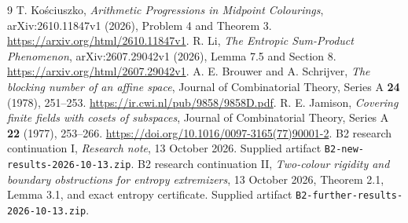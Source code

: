 \documentclass[11pt]{article}
\theoremstyle{remark}\newtheorem{remark}[theorem]{Remark}
\begin{document}
\begin{thebibliography}{9}
\small\setlength{\itemsep}{3pt}
T. Ko\'sciuszko, \emph{Arithmetic Progressions in Midpoint Colourings},
arXiv:2610.11847v1 (2026), Problem 4 and Theorem 3.
\url{https://arxiv.org/html/2610.11847v1}.
R. Li, \emph{The Entropic Sum-Product Phenomenon}, arXiv:2607.29042v1
(2026), Lemma 7.5 and Section 8.
\url{https://arxiv.org/html/2607.29042v1}.
A. E. Brouwer and A. Schrijver, \emph{The blocking number of an affine
space}, Journal of Combinatorial Theory, Series A \textbf{24} (1978),
251--253. \url{https://ir.cwi.nl/pub/9858/9858D.pdf}.
R. E. Jamison, \emph{Covering finite fields with cosets of subspaces},
Journal of Combinatorial Theory, Series A \textbf{22} (1977), 253--266.
\url{https://doi.org/10.1016/0097-3165(77)90001-2}.
B2 research continuation I, \emph{Research note}, 13 October 2026.
Supplied artifact \texttt{B2-new-results-2026-10-13.zip}.
B2 research continuation II, \emph{Two-colour rigidity and boundary
obstructions for entropy extremizers}, 13 October 2026, Theorem 2.1,
Lemma 3.1, and exact entropy certificate. Supplied artifact
\texttt{B2-further-results-2026-10-13.zip}.
\end{thebibliography}
\end{document}
